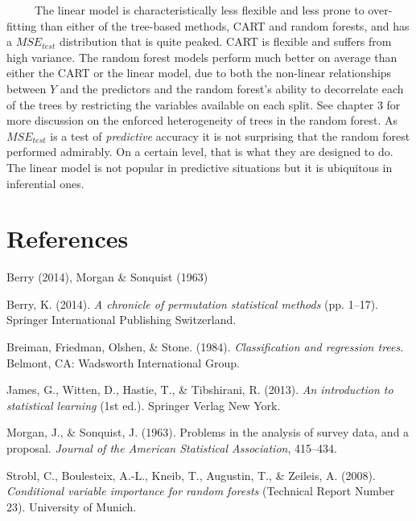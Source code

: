 \documentclass[12pt,twoside]{reedthesis}
\begin{document}
  ~~~~~The linear model is characteristically less flexible and less prone
  to over-fitting than either of the tree-based methods, CART and random
  forests, and has a \(MSE_{test}\) distribution that is quite peaked.
  CART is flexible and suffers from high variance. The random forest
  models perform much better on average than either the CART or the linear
  model, due to both the non-linear relationships between \(Y\) and the
  predictors and the random forest's ability to decorrelate each of the
  trees by restricting the variables available on each split. See chapter
  3 for more discussion on the enforced heterogeneity of trees in the
  random forest. As \(MSE_{test}\) is a test of \emph{predictive} accuracy
  it is not surprising that the random forest performed admirably. On a
  certain level, that is what they are designed to do. The linear model is
  not popular in predictive situations but it is ubiquitous in inferential
  ones.
  
  \backmatter
  
  \chapter{References}\label{references}
  
  \noindent
  
  \setlength{\parindent}{-0.20in} \setlength{\leftskip}{0.20in}
  \setlength{\parskip}{8pt}
  
  Berry (2014), Morgan \& Sonquist (1963)
  
  \hypertarget{refs}{}
  \hypertarget{ref-berry}{}
  Berry, K. (2014). \emph{A chronicle of permutation statistical methods}
  (pp. 1--17). Springer International Publishing Switzerland.
  
  \hypertarget{ref-bibCART}{}
  Breiman, Friedman, Olshen, \& Stone. (1984). \emph{Classification and
  regression trees}. Belmont, CA: Wadsworth International Group.
  
  \hypertarget{ref-bibISL}{}
  James, G., Witten, D., Hastie, T., \& Tibshirani, R. (2013). \emph{An
  introduction to statistical learning} (1st ed.). Springer Verlag New
  York.
  
  \hypertarget{ref-morganSonquist}{}
  Morgan, J., \& Sonquist, J. (1963). Problems in the analysis of survey
  data, and a proposal. \emph{Journal of the American Statistical
  Association}, 415--434.
  
  \hypertarget{ref-bibstrobl2008}{}
  Strobl, C., Boulesteix, A.-L., Kneib, T., Augustin, T., \& Zeileis, A.
  (2008). \emph{Conditional variable importance for random forests}
  (Technical Report Number 23). University of Munich.


\end{document}
